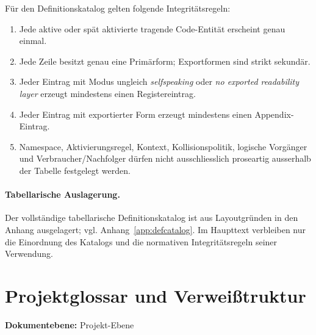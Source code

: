 \documentclass[11pt,a4paper]{article}
\newcommand{\doclevel}[1]{\par\small\noindent\textbf{Dokumentebene:} #1\par\normalsize\medskip}
\begin{document}
Für den Definitionskatalog gelten folgende Integritätsregeln:
\begin{enumerate}
\item Jede aktive oder spät aktivierte tragende Code-Entität erscheint genau einmal.
\item Jede Zeile besitzt genau eine Primärform; Exportformen sind strikt sekundär.
\item Jeder Eintrag mit Modus ungleich \emph{selfspeaking} oder \emph{no exported readability layer} erzeugt mindestens einen Registereintrag.
\item Jeder Eintrag mit exportierter Form erzeugt mindestens einen Appendix-Eintrag.
\item Namespace, Aktivierungsregel, Kontext, Kollisionspolitik, logische Vorgänger und Verbraucher/Nachfolger dürfen nicht ausschliesslich proseartig ausserhalb der Tabelle festgelegt werden.
\end{enumerate}

\paragraph{Tabellarische Auslagerung.}
Der vollständige tabellarische Definitionskatalog ist aus Layoutgründen in den Anhang ausgelagert; vgl. Anhang~\ref{app:defcatalog}. Im Haupttext verbleiben nur die Einordnung des Katalogs und die normativen Integritätsregeln seiner Verwendung.

\newpage
\section{Projektglossar und Verweißtruktur}

\doclevel{Projekt-Ebene}
\end{document}
